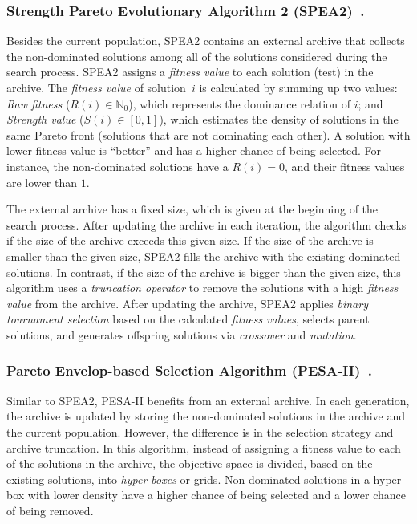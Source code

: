 \subsubsection{Strength Pareto Evolutionary Algorithm 2 (SPEA2)~\cite{zitzler2001spea2}. } 
%
Besides the current population, SPEA2 contains an external archive that collects the non-dominated solutions among all of the solutions considered during the search process. SPEA2 assigns a \textit{fitness value} to each solution (test) in the archive. The \textit{fitness value} of solution~$i$ is calculated by summing up two values: \textit{Raw fitness} ($R(i) \in \mathbb{N}_{0}$), which represents the dominance relation of $i$; and \textit{Strength value} ($S(i) \in [0,1]$), which estimates the density of solutions in the same Pareto front (solutions that are not dominating each other).
A solution with lower fitness value is ``better'' and has a higher chance of being selected. For instance, the non-dominated solutions have a $R(i) = 0$, and their fitness values are lower than $1$.

The external archive has a fixed size, which is given at the beginning of the search process. After updating the archive in each iteration, the algorithm checks if the size of the archive exceeds this given size. If the size of the archive is smaller than the given size, SPEA2 fills the archive with the existing dominated solutions. In contrast, if the size of the archive is bigger than the given size, this algorithm uses a \textit{truncation operator} to remove the solutions with a high \textit{fitness value} from the archive. After updating the archive, SPEA2 applies \textit{binary tournament selection} based on the calculated \textit{fitness values}, selects parent solutions, and  generates offspring solutions via  \textit{crossover} and \textit{mutation}.

\subsubsection{Pareto Envelop-based Selection Algorithm (PESA-II)~\cite{Corne2001}. }  
%
Similar to SPEA2, PESA-II benefits from an external archive. In each generation, the archive is updated by storing the non-dominated solutions in the archive and the current population. However, the difference is in the selection strategy and archive truncation. In this algorithm, instead of assigning a fitness value to each of the solutions in the archive, the objective space is divided, based on the existing solutions, into \emph{hyper-boxes} or grids. Non-dominated solutions in a hyper-box with lower density have a higher chance of being selected and a lower chance of being removed.

